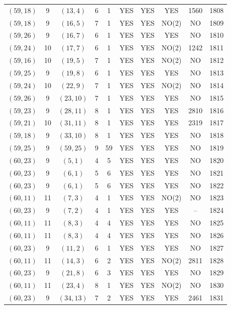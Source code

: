 \begin{longtable}{|c|c|c|c|c|c|c|c|c|c|}
$(59, 18)$ & 9 & $(13, 4)$ & 6 & 1 & YES & YES & YES & 1560 & 1808\\
$(59, 18)$ & 9 & $(16, 5)$ & 7 & 1 & YES & YES & NO(2) & NO & 1809\\
$(59, 26)$ & 9 & $(16, 7)$ & 6 & 1 & YES & YES & YES & NO & 1810\\
$(59, 24)$ & 10 & $(17, 7)$ & 6 & 1 & YES & YES & NO(2) & 1242 & 1811\\
$(59, 16)$ & 10 & $(19, 5)$ & 7 & 1 & YES & YES & NO(2) & NO & 1812\\
$(59, 25)$ & 9 & $(19, 8)$ & 6 & 1 & YES & YES & YES & NO & 1813\\
$(59, 24)$ & 10 & $(22, 9)$ & 7 & 1 & YES & YES & NO(2) & NO & 1814\\
$(59, 26)$ & 9 & $(23, 10)$ & 7 & 1 & YES & YES & YES & NO & 1815\\
$(59, 23)$ & 9 & $(28, 11)$ & 8 & 1 & YES & YES & YES & 2810 & 1816\\
$(59, 21)$ & 10 & $(31, 11)$ & 8 & 1 & YES & YES & YES & 2319 & 1817\\
$(59, 18)$ & 9 & $(33, 10)$ & 8 & 1 & YES & YES & YES & NO & 1818\\
$(59, 25)$ & 9 & $(59, 25)$ & 9 & 59 & YES & YES & YES & NO & 1819\\
$(60, 23)$ & 9 & $(5, 1)$ & 4 & 5 & YES & YES & YES & NO & 1820\\
$(60, 23)$ & 9 & $(6, 1)$ & 5 & 6 & YES & YES & YES & NO & 1821\\
$(60, 23)$ & 9 & $(6, 1)$ & 5 & 6 & YES & YES & YES & NO & 1822\\
$(60, 11)$ & 11 & $(7, 3)$ & 4 & 1 & YES & YES & NO(2) & NO & 1823\\
$(60, 23)$ & 9 & $(7, 2)$ & 4 & 1 & YES & YES & YES & -- & 1824\\
$(60, 11)$ & 11 & $(8, 3)$ & 4 & 4 & YES & YES & YES & NO & 1825\\
$(60, 11)$ & 11 & $(8, 3)$ & 4 & 4 & YES & YES & YES & NO & 1826\\
$(60, 23)$ & 9 & $(11, 2)$ & 6 & 1 & YES & YES & YES & NO & 1827\\
$(60, 11)$ & 11 & $(14, 3)$ & 6 & 2 & YES & YES & NO(2) & 2811 & 1828\\
$(60, 23)$ & 9 & $(21, 8)$ & 6 & 3 & YES & YES & YES & NO & 1829\\
$(60, 11)$ & 11 & $(23, 4)$ & 8 & 1 & YES & YES & NO(2) & NO & 1830\\
$(60, 23)$ & 9 & $(34, 13)$ & 7 & 2 & YES & YES & YES & 2461 & 1831\\

\end{longtable}
